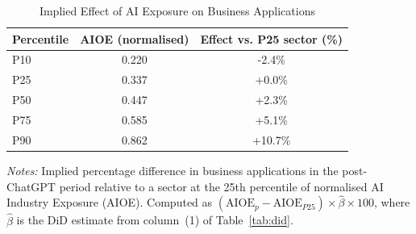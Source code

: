 \begin{table}[H]
\centering
\caption{Implied Effect of AI Exposure on Business Applications}
\label{tab:mfx}
\begin{tabular}{lcc}
\toprule
  Percentile & AIOE (normalised) & Effect vs. P25 sector (\%) \\
\midrule
  P10 & 0.220 & -2.4\%  \\
  P25 & 0.337 & +0.0\%  \\
  P50 & 0.447 & +2.3\%  \\
  P75 & 0.585 & +5.1\%  \\
  P90 & 0.862 & +10.7\%  \\
\bottomrule
\end{tabular}
\begin{tablenotes}[flushleft]\footnotesize
  \item \textit{Notes:} Implied percentage difference in business applications in the post-ChatGPT period relative to a sector at the 25th percentile of normalised AI Industry Exposure (AIOE). Computed as $(\text{AIOE}_p - \text{AIOE}_{P25}) \times \hat{\beta} \times 100$, where $\hat{\beta}$ is the DiD estimate from column~(1) of Table~\ref{tab:did}.
\end{tablenotes}
\end{table}
